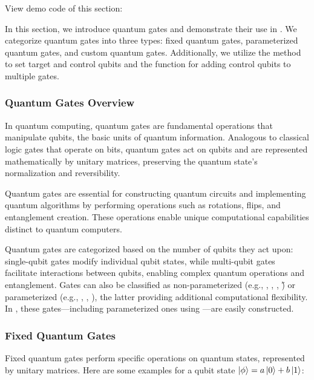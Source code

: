 View demo code of this section: 

In this section, we introduce quantum gates and demonstrate their use in \MindQuantum. We categorize quantum gates into three types: fixed quantum gates, parameterized quantum gates, and custom quantum gates. Additionally, we utilize the  method to set target and control qubits and the  function for adding control qubits to multiple gates.

\subsubsection{Quantum Gates Overview}

In quantum computing, quantum gates are fundamental operations that manipulate qubits, the basic units of quantum information. Analogous to classical logic gates that operate on bits, quantum gates act on qubits and are represented mathematically by unitary matrices, preserving the quantum state's normalization and reversibility.

Quantum gates are essential for constructing quantum circuits and implementing quantum algorithms by performing operations such as rotations, flips, and entanglement creation. These operations enable unique computational capabilities distinct to quantum computers.

Quantum gates are categorized based on the number of qubits they act upon: single-qubit gates modify individual qubit states, while multi-qubit gates facilitate interactions between qubits, enabling complex quantum operations and entanglement. Gates can also be classified as non-parameterized (e.g., \X, \Y, \Z, \H) or parameterized (e.g., \RX, \RY, \RZ), the latter providing additional computational flexibility. In \MindQuantum, these gates—including parameterized ones using \ParameterResolver—are easily constructed.

\subsubsection{Fixed Quantum Gates}
Fixed quantum gates perform specific operations on quantum states, represented by unitary matrices. Here are some examples for a qubit state $\ket{\phi}=a\ket{0}+b\ket{1}$:

